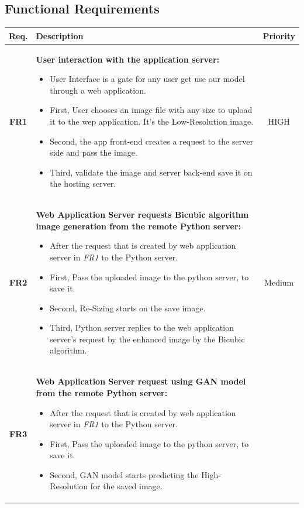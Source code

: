 \documentclass[12pt]{article}
\begin{document}
		\subsection{Functional Requirements}
			\begin{longtable}{|c|p{}|c|}
				\hline
				\textbf{Req.} & \textbf{Description} & \textbf{Priority} \\
				\hline
				\textbf{FR1} & \textbf{User interaction with the application server:}
				\begin{itemize}
					\item User Interface is a gate for any user get use our model through a web application.
					\item First, User chooses an image file with any size to upload it to the wep application. It’s the Low-Resolution image.
					\item Second, the app front-end creates a request to the server side and pass the image.
					\item Third, validate the image and server back-end save it on the hosting server.
				\end{itemize} & HIGH \\
				\hline
				\textbf{FR2} & \textbf{Web Application Server requests Bicubic algorithm image generation from the remote Python server:}
				\begin{itemize}
					\item After the request that is created by web application server in \textit{FR1} to the Python server.
					\item First, Pass the uploaded image to the python server, to save it.
					\item Second, Re-Sizing starts on the save image.
					\item Third, Python server replies to the web application server's request by the enhanced image by the Bicubic algorithm.
				\end{itemize} & Medium \\
				\hline
				\textbf{FR3} & \textbf{Web Application Server request using GAN model from the remote Python server:}
				\begin{itemize}
					\item After the request that is created by web application server in \textit{FR1} to the Python server.
					\item First, Pass the uploaded image to the python server, to save it.
					\item Second, GAN model starts predicting the High-Resolution for the saved image.

\end{itemize}
\end{longtable}
\end{document}
